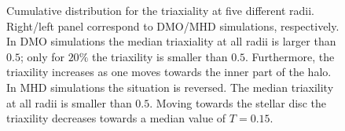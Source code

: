 \documentclass[usenatbib]{mnras}
\begin{document}
\begin{figure}
\caption{Cumulative distribution for the triaxiality at five different radii.
  Right/left panel correspond to DMO/MHD simulations, respectively. 
  In DMO simulations the median triaxiality at all radii is larger
  than $0.5$; only for $20\%$ the triaxility is smaller than $0.5$.
  Furthermore, the triaxility increases as one moves towards the inner
  part of the halo.
  In MHD simulations the situation is reversed.
  The median triaxility at all radii is smaller than $0.5$.
  Moving towards the stellar disc the triaxility decreases towards a median
  value of $T=0.15$.}
\label{fig:triaxial_cumulative}
\end{figure}
\end{document}
